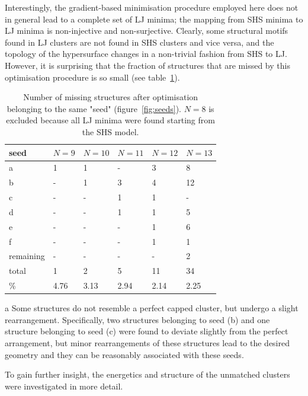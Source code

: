 Interestingly, the gradient-based minimisation procedure employed here does not
in general lead to a complete set of \ac{LJ} minima; the mapping from \ac{SHS}
minima to \ac{LJ} minima is non-injective and non-surjective. Clearly, some
structural motifs found in \ac{LJ} clusters are not found in \ac{SHS} clusters
and vice versa, and the topology of the hypersurface changes in a non-trivial
fashion from \ac{SHS} to \ac{LJ}. However, it is surprising that the fraction of
structures that are missed by this optimisation procedure is so small (see
table~\ref{tab:seeds}). 
%
\begin{table}[htb]\centering
    \begin{threeparttable}
    \caption{Number of missing structures after optimisation belonging to the
    same "seed" (figure~\ref{fig:seeds}). $N=8$ is excluded because all LJ minima were
    found starting from the \acs{SHS} model.}
    \label{tab:seeds}
    \begin{tabular}{llllll}\toprule
        seed      & $N=9$   & $N=10$  & $N=11$  & $N=12$  & $N=13$  \\ \midrule
        a         & 1    & 1    & -    & 3    & 8    \\
        b         & -    & 1    & 3    & 4    & 12\tnote{a}   \\
        c         & -    & -    & 1    & 1\tnote{a}    & -    \\
        d         & -    & -    & 1    & 1    & 5    \\
        e         & -    & -    & -    & 1    & 6    \\
        f         & -    & -    & -    & 1    & 1    \\
        remaining & -    & -    & -    & -    & 2    \\ 
        total     & 1    & 2    & 5    & 11   & 34   \\
        \%        & 4.76 & 3.13 & 2.94 & 2.14 & 2.25 \\ \bottomrule
    \end{tabular}
        \begin{tablenotes}
        \item[a]{Some structures do not resemble a perfect capped
        cluster, but undergo a slight rearrangement. Specifically, two structures belonging to seed (b) and one structure belonging to seed (c) were found to deviate slightly from the perfect arrangement, but minor rearrangements of these structures lead to the desired geometry and they can be reasonably associated with these seeds.}
        \end{tablenotes}
    \end{threeparttable}
\end{table}%
%
To gain further insight, the energetics and structure of the unmatched clusters
were investigated in more detail.

